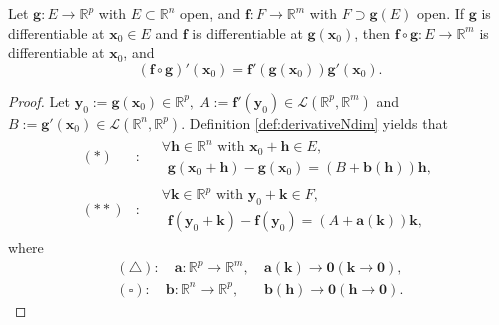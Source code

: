 \begin{thm}
  \label{thm:chainRuleOnFuncNdim}
  Let $\mathbf{g}:E\rightarrow \mathbb{R}^{p}$ with
  $E\subset \mathbb{R}^{n}$ open, and
  $\mathbf{f}:F\rightarrow \mathbb{R}^{m}$ with
  $F\supset \mathbf{g}(E)$ open. If $\mathbf{g}$ is differentiable
  at $\mathbf{x}_0\in E$ and $\mathbf{f}$ is differentiable at
  $\mathbf{g}(\mathbf{x}_0)$,
  then $\mathbf{f}\circ \mathbf{g}: E\rightarrow \mathbb{R}^{m}$
  is differentiable at
  $\mathbf{x}_0$, and
  \begin{equation}
    \label{eq:chainRuleOnFuncNdim}
    (\mathbf{f}\circ \mathbf{g})'(\mathbf{x}_0)
    =\mathbf{f}'(\mathbf{g}(\mathbf{x}_0))\mathbf{g}'(\mathbf{x}_0).
  \end{equation}
\end{thm}
\begin{proof}
  Let $\mathbf{y}_{0}:=\mathbf{g}(\mathbf{x}_{0})\in \mathbb{R}^{p},\
  A:=\mathbf{f}'(\mathbf{y}_{0})\in
  \mathcal{L}(\mathbb{R}^{p},\mathbb{R}^{m})$ and
  $B:=\mathbf{g}'(\mathbf{x}_{0})\in
  \mathcal{L}(\mathbb{R}^{n},\mathbb{R}^{p})$.
  Definition \ref{def:derivativeNdim} yields that
  \begin{align*}
    (*)&:\quad
    \begin{array}{ll}
      \forall\mathbf{h}\in \mathbb{R}^{n}
               \text{ with }\mathbf{x}_{0}+\mathbf{h}\in E,\\
      \ \ \mathbf{g}(\mathbf{x}_{0}+\mathbf{h})-\mathbf{g}(\mathbf{x}_{0})
      =(B+\mathbf{b}(\mathbf{h}))\mathbf{h},
    \end{array}
    \\
    (**)&:\quad
    \begin{array}{l}
       \forall\mathbf{k}\in \mathbb{R}^{p}
                \text{ with }\mathbf{y}_{0}+\mathbf{k}\in F,\\
      \ \ \mathbf{f}(\mathbf{y}_{0}+\mathbf{k})-\mathbf{f}(\mathbf{y}_{0})
      =(A+\mathbf{a}(\mathbf{k}))\mathbf{k},
    \end{array}
  \end{align*}
  where  
  \begin{align*}
    (\triangle):\quad
    \mathbf{a}:\mathbb{R}^{p}\rightarrow \mathbb{R}^{m},\
    &\mathbf{a}(\mathbf{k})\rightarrow \mathbf{0}
      (\mathbf{k}\rightarrow \mathbf{0}),\\
    (\square):\quad
      \mathbf{b}:\mathbb{R}^{n}\rightarrow \mathbb{R}^{p},\ 
    &\mathbf{b}(\mathbf{h})\rightarrow \mathbf{0}
      (\mathbf{h}\rightarrow \mathbf{0}).
  \end{align*}

\end{proof}
